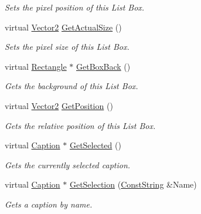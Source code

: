 \begin{DoxyCompactItemize}
\begin{DoxyCompactList}\small\item\em Sets the pixel position of this List Box. \item\end{DoxyCompactList}\item 
virtual \hyperlink{classphys_1_1Vector2}{Vector2} \hyperlink{classphys_1_1UI_1_1ListBox_a23133ed4a98994d838acee4c6a981e04}{GetActualSize} ()
\begin{DoxyCompactList}\small\item\em Sets the pixel size of this List Box. \item\end{DoxyCompactList}\item 
virtual \hyperlink{classphys_1_1UI_1_1Rectangle}{Rectangle} $\ast$ \hyperlink{classphys_1_1UI_1_1ListBox_a087fba492ebd70a58d2772fccbfec466}{GetBoxBack} ()
\begin{DoxyCompactList}\small\item\em Gets the background of this List Box. \item\end{DoxyCompactList}\item 
virtual \hyperlink{classphys_1_1Vector2}{Vector2} \hyperlink{classphys_1_1UI_1_1ListBox_af688db0628a5588865a890584f754b02}{GetPosition} ()
\begin{DoxyCompactList}\small\item\em Gets the relative position of this List Box. \item\end{DoxyCompactList}\item 
virtual \hyperlink{classphys_1_1UI_1_1Caption}{Caption} $\ast$ \hyperlink{classphys_1_1UI_1_1ListBox_a729f4ef3e0bc10bf8e96f20a83767484}{GetSelected} ()
\begin{DoxyCompactList}\small\item\em Gets the currently selected caption. \item\end{DoxyCompactList}\item 
virtual \hyperlink{classphys_1_1UI_1_1Caption}{Caption} $\ast$ \hyperlink{classphys_1_1UI_1_1ListBox_a1a5f9c44430387cc96744411bea9e978}{GetSelection} (\hyperlink{namespacephys_a5ce5049f8b4bf88d6413c47b504ebb31}{ConstString} \&Name)
\begin{DoxyCompactList}\small\item\em Gets a caption by name. \item\end{DoxyCompactList}\item 

\end{DoxyCompactItemize}
